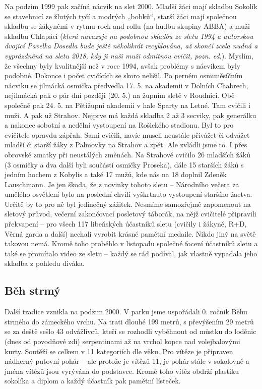 Na podzim 1999 pak začíná nácvik na slet 2000. Mladší žáci mají skladbu
Sokolík se stavebnicí ze žlutých tyčí a modrých „bobků``, starší žáci
mají společnou skladbu se žákyněmi v rytmu rock and rollu (na hudbu
skupiny ABBA) a muži skladbu Chlapáci (\emph{která navazuje na podobnou
skladbu ze sletu 1994 a autorskou dvojicí Pavelka Dosedla bude ještě
několikrát recyklována, až skončí zcela nudná a vyprázdněná na sletu
2018, kdy ji naši muži odmítnou cvičit, pozn. ed}.). Myslím, že všechny
byly kvalitnější než v roce 1994, avšak problémy s nácvikem byly
podobné. Dokonce i počet cvičících se skoro nelišil. Po perném
osmiměsíčním nácviku se jilmácká osmička předvedla 17. 5. na akademii v
Dolních Chabrech, nejilmácká pak o pár dní později (20. 5.) na župním
sletě v Roudnici. Obě společně pak 24. 5. na Pětižupní akademii v hale
Sparty na Letné. Tam cvičili i muži. A pak už Strahov. Nejprve má každá
skladba 2 až 3 secviky, pak generálku a nakonec sobotní a nedělní
vystoupení na Rošického stadionu. Byl to pro cvičitele opravdu zápřah.
Sami cvičili, navíc museli neustále přivážet či odvážet mladší či starší
žáky z Palmovky na Strahov a zpět. Ale zvládli jsme to. I přes obrovské
zmatky při neustálých změnách. Na Strahově cvičilo 26 mladších žáků (3
osmičky a dva další byli součástí osmičky Proseka), dále 15 starších
žáků s jedním hochem z Kobylis a také 17 mužů, kde nás na 18 doplnil
Zdeněk Lauschmann. Je jen škoda, že z novinky tohoto sletu -- Národního
večera za umělého osvětlení bylo na poslední chvíli vyškrtnuto
vystoupení staršího žactva. Určitě by to pro ně byl jedinečný zážitek.
Nesmíme samozřejmě zapomenout na sletový průvod, večerní zakončovací
posletový táborák, na nějž cvičitelé připravili překvapení -- pro všech
117 libeňských účastníků sletu (cvičily i žákyně, R+D, Věrná garda a
další) nechali vyrobit krásné pamětní medaile. Nikdo jiný na světě
takovou nemá. Kromě toho proběhlo v listopadu společné focení účastníků
sletu a také se promítalo video ze sletu -- každý se rád podíval, jak
vlastně vypadala jeho skladba z pohledu diváka.

\subsection{Běh strmý}\label{bux11bh-strmuxfd}

Další tradice vznikla na podzim 2000. V parku jsme uspořádali 0. ročník
Běhu strmého do zámeckého vrchu. Na trati dlouhé 199 metrů, s převýšením
29 metrů se za deště sešlo 43 odvážlivců, kteří se rozhodli vyběhnout od
můstku do loděnic (dnes od povodňové zdi) serpentinami až na vrchol
kopce nad volejbalovými kurty. Soutěží se celkem v 11 kategoriích dle
věku. Pro vítěze je připraven nádherný putovní pohár -- ale protože je
vítězů 11, je pohár stále v sokolovně a jména vítězů jsou vyrývána do
podstavce. Kromě toho vítěz obdrží plastiku sokolíka a diplom a každý
účastník pak pamětní lísteček.

